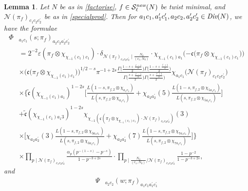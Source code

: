 \documentclass[12pt,reqno]{amsart}
\theoremstyle{plain}
\newtheorem{lemma}{Lemma}
\theoremstyle{remark}
\numberwithin{equation}{section}
\numberwithin{lemma}{section}
\numberwithin{theorem}{section}
\numberwithin{prop}{section}
\numberwithin{remark}{section}
\begin{document}
\begin{lemma} \label{matrixfunc2}
Let $N$ be as in \eqref{factorise}, $f \in \mathcal{S}^{\emph{new}}_{\ell}(N)$ be twist minimal,
and $\mathcal{N}(\pi_f)_{c_1 c_2 c_2^{\prime}}$ 
be as in \eqref{specialprod}. Then for 
$a_1 c_1, a_1^{\prime} c_1^{\prime}, a_2 c_2, a_2^{\prime} c_2^{\prime} \in \emph{Div}(N)$, 
we have the formulae
\begin{align} \label{tildephi}
\Phi&_{a_1 c_1}(s;\pi_f)_{a_2c_2a_2^{\prime}c_2^{\prime}} \nonumber \\
&=2^{-2} \varepsilon(\pi_f \otimes \chi_{\chi_{-1}(c_1) c_1}) 
\cdot \delta_{\mathcal{N}(\pi_f)_{c_1 c_2 c_2^{\prime} }  \mid \frac{N_0}{(c_1,N_0)}}
\cdot \chi_{\chi_{-1}(c_1) a_1} \big({-{\mathfrak{c}(\pi_f \otimes \chi_{\chi_{-1}(c_1)c_1}})} \big) \nonumber \\
& \times \big({\mathfrak{c}(\pi_f \otimes \chi_{\chi_{-1}(c_1)c_1}}) \big)^{1/2-s} \pi^{-1+2s} 
 \frac{\Gamma \Big(\frac{1-s+\frac{\ell-1}{2}}{2} \Big)
 \Gamma \Big(\frac{1-s+\frac{\ell+1}{2}}{2} \Big)}
{\Gamma \Big(\frac{s+\frac{\ell-1}{2}}{2} \Big) \Gamma \Big(\frac{s+\frac{\ell+1}{2}}{2} \Big)} 
\chi_{a_1 c_1} \big(\mathcal{N}(\pi_f)_{c_1 c_2 c_2^{\prime}} \big) \nonumber \\
& \times \Bigg \{ \widetilde{\mathfrak{c}}(\chi_{\chi_{-1}(c_1) a_1})^{1-2s} 
\Bigg[ \frac{L(1-s,\pi_{f,2} \otimes \chi_{a_1 c_1})}{L(s,\pi_{f,2} \otimes \chi_{a_1 c_1})} +\chi_{a_2 a_2^{\prime} }(5)
\frac{L(1-s,\pi_{f,2} \otimes \chi_{5 a_1 c_1 })}{L(s,\pi_{f,2} \otimes \chi_{5 a_1 c_1})} \Bigg] \nonumber \\
& + \widetilde{\mathfrak{c}}(\chi_{\chi_{-1}(c_1) a_1 3  } )^{1-2s} \chi_{\chi_{-1}(\mathfrak{c}(\pi_f \otimes \chi_{\chi_{-1}(c_1) c_1}) 
\cdot \mathcal{N}(\pi_f)_{c_1 c_2 c_2^{\prime}} )}(3) \nonumber  \\
& \times \Bigg [\chi_{a_2 a_2^{\prime}}(3) \frac{L(1-s,\pi_{f,2} \otimes \chi_{3a_1 c_1})}{L(s,\pi_{f,2} \otimes \chi_{3a_1 c_1})}
+\chi_{a_2 a_2^{\prime}}(7) \frac{L(1-s,\pi_{f,2} \otimes \chi_{7a_1 c_1})}{L(s,\pi_{f,2} \otimes \chi_{7a_1 c_1})} \Bigg ]  \Bigg \} \nonumber \\
& \times \prod_{p \mid \mathcal{N}(\pi_f)_{c_1 c_2 c_2^{\prime}} }
\frac{\alpha_p  \left(p^{-(1-s)}-p^{-s} \right)}{1-p^{-3+2s}} \cdot 
\prod_{p \mid \frac{N_0}{(c_1,N_0)}/\mathcal{N}(\pi_f)_{c_1 c_2 c_2^{\prime}}  } 
 \frac{1-p^{-2}}{1-p^{-3+2s}},
\end{align}
and
\begin{align} \label{tildepsi}
\Psi&_{a_2 c_2}(w;\pi_f)_{a_1c_1a_1^{\prime}c_1^{\prime}} \nonumber \\

\end{align}
\end{lemma}
\end{document}
